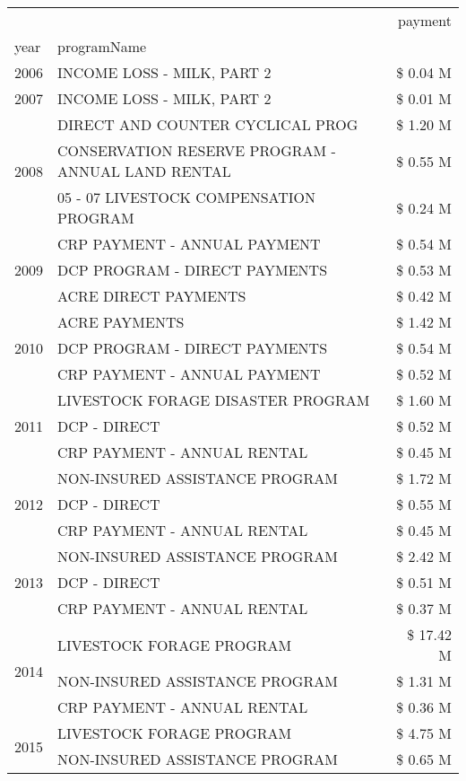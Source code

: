 \begin{tabular}{llr}
\toprule
 &  & payment \\
year & programName &  \\
\midrule
2006 & INCOME LOSS - MILK, PART 2 & \$ 0.04 M \\
\cline{1-3}
2007 & INCOME LOSS - MILK, PART 2 & \$ 0.01 M \\
\cline{1-3}
\multirow[t]{3}{*}{2008} & DIRECT AND COUNTER CYCLICAL PROG & \$ 1.20 M \\
 & CONSERVATION RESERVE PROGRAM - ANNUAL LAND RENTAL & \$ 0.55 M \\
 & 05 - 07 LIVESTOCK COMPENSATION PROGRAM & \$ 0.24 M \\
\cline{1-3}
\multirow[t]{3}{*}{2009} & CRP PAYMENT - ANNUAL PAYMENT & \$ 0.54 M \\
 & DCP PROGRAM - DIRECT PAYMENTS & \$ 0.53 M \\
 & ACRE DIRECT PAYMENTS & \$ 0.42 M \\
\cline{1-3}
\multirow[t]{3}{*}{2010} & ACRE PAYMENTS & \$ 1.42 M \\
 & DCP PROGRAM - DIRECT PAYMENTS & \$ 0.54 M \\
 & CRP PAYMENT - ANNUAL PAYMENT & \$ 0.52 M \\
\cline{1-3}
\multirow[t]{3}{*}{2011} & LIVESTOCK FORAGE DISASTER PROGRAM & \$ 1.60 M \\
 & DCP - DIRECT & \$ 0.52 M \\
 & CRP PAYMENT - ANNUAL RENTAL & \$ 0.45 M \\
\cline{1-3}
\multirow[t]{3}{*}{2012} & NON-INSURED ASSISTANCE PROGRAM & \$ 1.72 M \\
 & DCP - DIRECT & \$ 0.55 M \\
 & CRP PAYMENT - ANNUAL RENTAL & \$ 0.45 M \\
\cline{1-3}
\multirow[t]{3}{*}{2013} & NON-INSURED ASSISTANCE PROGRAM & \$ 2.42 M \\
 & DCP - DIRECT & \$ 0.51 M \\
 & CRP PAYMENT - ANNUAL RENTAL & \$ 0.37 M \\
\cline{1-3}
\multirow[t]{3}{*}{2014} & LIVESTOCK FORAGE PROGRAM & \$ 17.42 M \\
 & NON-INSURED ASSISTANCE PROGRAM & \$ 1.31 M \\
 & CRP PAYMENT - ANNUAL RENTAL & \$ 0.36 M \\
\cline{1-3}
\multirow[t]{3}{*}{2015} & LIVESTOCK FORAGE PROGRAM & \$ 4.75 M \\
 & NON-INSURED ASSISTANCE PROGRAM & \$ 0.65 M \\

\end{tabular}
